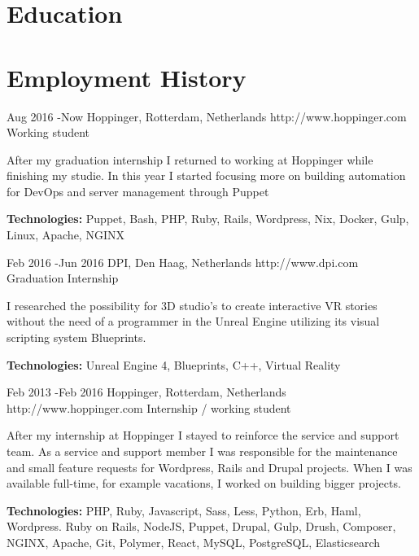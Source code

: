 \documentclass[10pt]{article} %
\begin{document}

\section{Education}





\section{Employment History}

\job
{Aug 2016 -}{Now}
{Hoppinger, Rotterdam, Netherlands}
{http://www.hoppinger.com}
{Working student}
{After my graduation internship I returned to working at Hoppinger while finishing my studie. In this year I started focusing more on building automation for DevOps and server management through Puppet

\rule{0mm}{5mm}\textbf{Technologies:} Puppet, Bash, PHP, Ruby, Rails, Wordpress, Nix, Docker, Gulp, Linux, Apache, NGINX }

\job
{Feb 2016 -}{Jun 2016}
{DPI, Den Haag, Netherlands}
{http://www.dpi.com}
{Graduation Internship}
{I researched the possibility for 3D studio's to create interactive VR stories without the need of a programmer in the Unreal Engine utilizing its visual scripting system Blueprints.\\
\rule{0mm}{5mm}\textbf{Technologies:} Unreal Engine 4, Blueprints, C++, Virtual Reality}

\newpage 
\job
{Feb 2013 -}{Feb 2016}
{Hoppinger, Rotterdam, Netherlands}
{http://www.hoppinger.com}
{Internship / working student}
{After my internship at Hoppinger I stayed to reinforce the service and support team. As a service and support member I was responsible for the maintenance and small feature requests for Wordpress, Rails and Drupal projects. When I was available full-time, for example vacations, I worked on building bigger projects.

\rule{0mm}{5mm}\textbf{Technologies:} PHP, Ruby, Javascript, Sass, Less, Python, Erb, Haml, Wordpress. Ruby on Rails, NodeJS, Puppet, Drupal, Gulp, Drush, Composer, NGINX, Apache, Git, Polymer, React, MySQL, PostgreSQL, Elasticsearch
}
\end{document}
